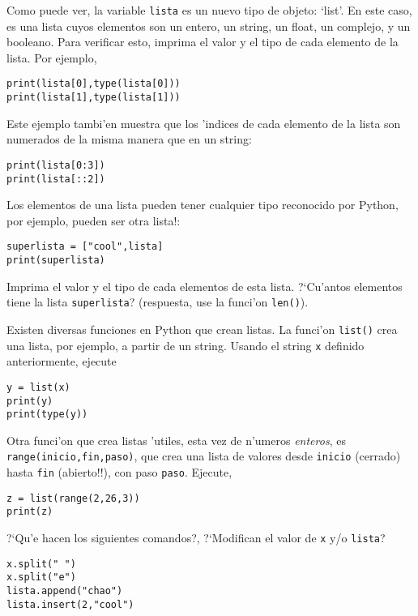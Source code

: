 \documentclass[11pt]{exam}
\begin{document}
\begin{questions}
Como puede ver, la variable \texttt{lista} es un nuevo tipo de objeto: `list'. En este caso, es una lista cuyos elementos son un entero, un string, un float, un complejo, y un booleano. Para verificar esto, imprima el valor y el tipo de cada elemento de la lista. Por ejemplo,

\begin{verbatim}
print(lista[0],type(lista[0]))
print(lista[1],type(lista[1]))
\end{verbatim}

Este ejemplo tambi'en muestra que los 'indices de cada elemento de la lista son numerados de la misma manera que en un string:

\begin{verbatim}
print(lista[0:3])
print(lista[::2])
\end{verbatim}

\item Los elementos de una lista pueden tener cualquier tipo reconocido por Python, por ejemplo, pueden ser otra lista!:

\begin{verbatim}
superlista = ["cool",lista]
print(superlista)
\end{verbatim}

Imprima el valor y el tipo de cada elementos de esta lista. ?`Cu'antos elementos tiene la lista \texttt{superlista}? (respuesta, use la funci'on \texttt{len()}).

\item Existen diversas funciones en Python que crean listas. La funci'on \texttt{list()} crea una lista, por ejemplo, a partir de un string. Usando el string \texttt{x} definido anteriormente, ejecute

\begin{verbatim}
y = list(x)
print(y)
print(type(y))
\end{verbatim}

\item Otra funci'on que crea listas 'utiles, esta vez de n'umeros \textit{enteros}, es \texttt{range(inicio,fin,paso)}, que crea una lista de valores desde \texttt{inicio} (cerrado) hasta \texttt{fin} (abierto!!), con paso \texttt{paso}. Ejecute,

\begin{verbatim}
z = list(range(2,26,3))
print(z)
\end{verbatim}

\item ?`Qu'e hacen los siguientes comandos?, ?`Modifican el valor de \texttt{x} y/o \texttt{lista}?

\begin{verbatim}
x.split(" ")
x.split("e")
lista.append("chao")
lista.insert(2,"cool")
\end{verbatim}

\end{questions}
\end{document}
